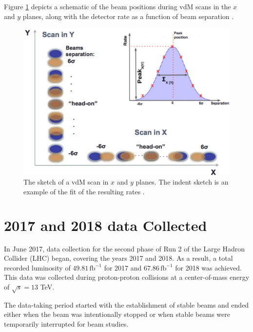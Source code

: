 Figure \ref{vdm_sketch} depicts a schematic of the beam positions during vdM scans in the $x$ and $y$ planes, along with the detector rate as a function of beam separation  \cite{pas_18}.
\newpage
\begin{center}
  \begin{figure}[ht]
    \centering
    \includegraphics[scale=.50]{Chapter3/vdm_sketch.png}
    \caption[Sketch of a vdM scan in $x$ and $y$ directions and example of fitting resulting rates]{ The sketch of a vdM scan in $x$ and $y$ planes. The indent sketch is an example of the fit of the resulting rates \cite{vdM_sketch}.}
    \label{vdm_sketch}
  \end{figure}
\end{center}








\section{2017 and 2018 data Collected}
\label{Run 2 data Collected}

In June 2017, data collection for the second phase of Run 2 of the Large Hadron Collider (LHC) began, covering the years 2017 and 2018. As a result, a total recorded luminosity of \(49.81 \, \text{fb}^{-1}\) for 2017 and \(67.86 \, \text{fb}^{-1}\) for 2018 was achieved. This data was collected during proton-proton collisions at a center-of-mass energy of \(\sqrt{s} = 13\) TeV.  

The data-taking period started with the establishment of stable beams and ended either when the beam was intentionally stopped or when stable beams were temporarily interrupted for beam studies.  

